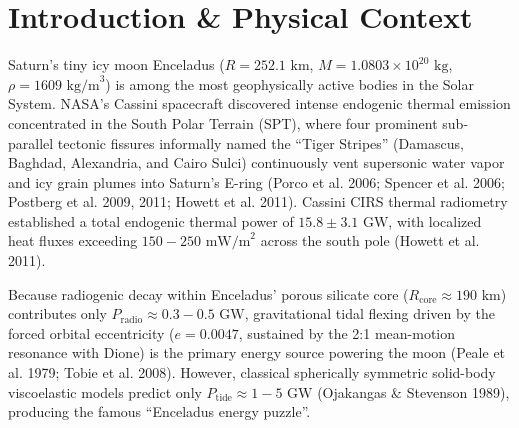 \documentclass[11pt,a4paper]{article}
\begin{document}
\section{Introduction \& Physical Context}

Saturn's tiny icy moon Enceladus ($R = 252.1\text{ km}$, $M = 1.0803 \times 10^{20}\text{ kg}$, $\rho = 1609\text{ kg/m}^3$) is among the most geophysically active bodies in the Solar System. NASA's Cassini spacecraft discovered intense endogenic thermal emission concentrated in the South Polar Terrain (SPT), where four prominent sub-parallel tectonic fissures informally named the ``Tiger Stripes'' (Damascus, Baghdad, Alexandria, and Cairo Sulci) continuously vent supersonic water vapor and icy grain plumes into Saturn's E-ring (Porco et al. 2006; Spencer et al. 2006; Postberg et al. 2009, 2011; Howett et al. 2011). Cassini CIRS thermal radiometry established a total endogenic thermal power of $15.8 \pm 3.1\text{ GW}$, with localized heat fluxes exceeding $150-250\text{ mW/m}^2$ across the south pole (Howett et al. 2011).

Because radiogenic decay within Enceladus' porous silicate core ($R_{\text{core}} \approx 190\text{ km}$) contributes only $P_{\text{radio}} \approx 0.3-0.5\text{ GW}$, gravitational tidal flexing driven by the forced orbital eccentricity ($e = 0.0047$, sustained by the 2:1 mean-motion resonance with Dione) is the primary energy source powering the moon (Peale et al. 1979; Tobie et al. 2008). However, classical spherically symmetric solid-body viscoelastic models predict only $P_{\text{tide}} \approx 1-5\text{ GW}$ (Ojakangas \& Stevenson 1989), producing the famous ``Enceladus energy puzzle''.
\end{document}
